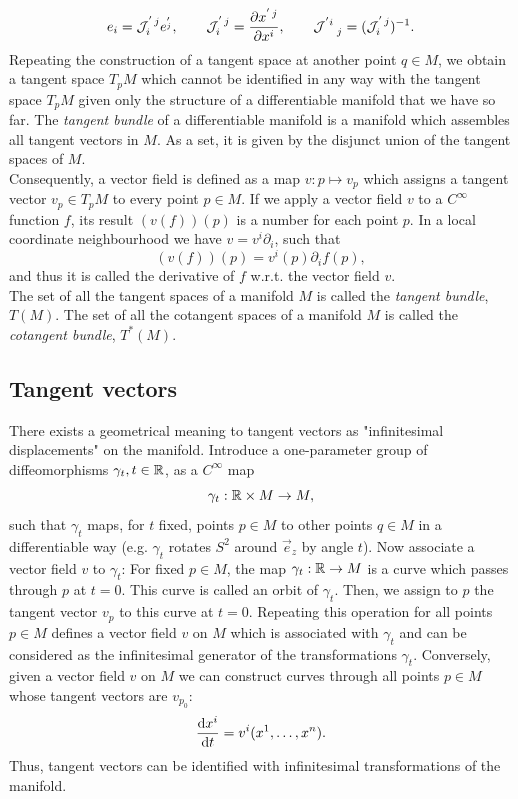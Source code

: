 \begin{equation}
	e_i = \mathcal{J}^{' \, j}_i e^{'_j}, \qquad \mathcal{J}^{'\, j}_i = \frac{\partial x^{'\, j }}{\partial x^i}, \qquad \mathcal{J}^{' i }_{\quad j} = (\mathcal{J}^{'\, j}_i )^{-1}.
\end{equation}
Repeating the construction of a tangent space at another point $q\in M$, we obtain a tangent space $T_p M$ which cannot be identified in any way with the tangent space $T_p M$ given only the structure of a differentiable manifold that we have so far. The \emph{tangent bundle} of a differentiable manifold is a manifold which assembles all tangent vectors in $M$. As a set, it is given by the disjunct union of the tangent spaces of $M$.\\
Consequently, a vector field is defined as a map $v:p\mapsto v_p$ which assigns a tangent vector $v_p \in T_p M$ to every point $p\in M$. If we apply a vector field $v$ to a $C^{\infty}$ function $f$, its result $(v(f))(p)$ is a number for each point $p$. In a local coordinate neighbourhood we have $v=v^i \partial_i$, such that 
\begin{equation}
	(v(f))(p) = v^i (p) \partial_i f(p),
\end{equation} 
and thus it is called the derivative of $f$ w.r.t. the vector field $v$.\\
The set of all the tangent spaces
of a manifold $M$ is called the \emph{tangent bundle}, $T (M)$. The set of all the cotangent spaces
of a manifold $M$ is called the \emph{cotangent bundle}, $T^* (M)$.

\subsection{Tangent vectors}
\label{subsubsec:tangentvectors}
There exists a geometrical meaning to tangent vectors as "infinitesimal displacements" on the manifold. Introduce a one-parameter group of diffeomorphisms $\gamma_t, t\in \mathbb{R}$, as a $C^{\infty}$ map
\begin{equation}
	\gamma_t:\mathbb{R} \times M \rightarrow M,
\end{equation}
such that $\gamma_t$ maps, for $t$ fixed, points $p\in M$ to other points $q \in M$ in a differentiable way (e.g. $\gamma_t$ rotates $S^2$ around $\vec{e}_z$ by angle $t$). Now associate a vector field $v$ to $\gamma_t$: For fixed $p\in M$, the map $\gamma_t:\mathbb{R} \rightarrow M$ is a curve which passes through $p$ at $t=0$. This curve is called an orbit of $\gamma_t$. Then, we assign to $p$ the tangent vector $v_p$ to this curve at $t=0$. Repeating this operation for all points $p \in M$ defines a vector field $v$ on $M$ which is associated with $\gamma_t$ and can be considered as the infinitesimal generator of the transformations $\gamma_t$. Conversely, given a vector field $v$ on $M$ we can construct curves through all points $p\in M$ whose tangent vectors are $v_{p_0}$:
\begin{equation}
\frac{\mathrm{d} x^i }{\mathrm{d} t} = v^i (x^1, \dots, x^n).
\end{equation}
Thus, tangent vectors can be identified with infinitesimal transformations of the manifold.





